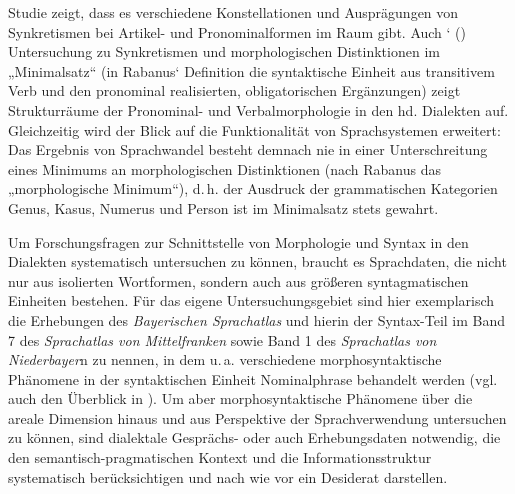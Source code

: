  Studie zeigt, dass es verschiedene Konstellationen und Ausprägungen von Synkretismen bei Artikel- und Pronominalformen im Raum gibt. Auch \citeauthor{Rabanus2008}‘ (\citeyear{Rabanus2008}) Untersuchung zu Synkretismen und morphologischen Dis\-tinktionen im „Minimalsatz“ (in Rabanus‘ Definition die syntaktische Einheit aus transitivem Verb und den pronominal realisierten, obligatorischen Ergänzungen) zeigt Strukturräume der Pronominal- und Verbalmorphologie in den hd. Dialekten auf. Gleichzeitig wird der Blick auf die Funktionalität von Sprachsystemen erweitert: Das Ergebnis von Sprachwandel besteht demnach nie in einer Unterschreitung eines Minimums an morphologischen Distinktionen (nach Rabanus das „morphologische Minimum“), d.\,h. der Ausdruck der grammatischen Kategorien Genus, Kasus, Numerus und Person ist im Minimalsatz stets gewahrt.

\begin{sloppypar}
Um Forschungsfragen zur Schnittstelle von Morphologie und Syntax in den Dialekten systematisch untersuchen zu können, braucht es Sprachdaten, die nicht nur aus isolierten Wortformen, sondern auch aus größeren syntagmatischen Einheiten bestehen. Für das eigene Untersuchungsgebiet sind hier exemplarisch die Erhebungen des \textit{Bayerischen Sprachatlas} und hierin der Syntax-Teil im Band 7 des \textit{Sprachatlas von Mittelfranken} sowie Band 1 des \textit{Sprachatlas von Niederbayer}n zu nennen, in dem u.\,a. verschiedene morphosyntaktische Phänomene in der syntaktischen Einheit Nominalphrase behandelt werden (vgl. auch den Überblick in \citealt[40--43]{SchmidtEtAl2019}). Um aber morphosyntaktische Phänomene über die areale Dimension hinaus und aus Perspektive der Sprachverwendung untersuchen zu können, sind dialektale Gesprächs- oder auch Erhebungsdaten notwendig, die den semantisch-pragmatischen Kontext und die Informationsstruktur sys\-tematisch berücksichtigen und nach wie vor ein Desiderat darstellen.
\end{sloppypar}
